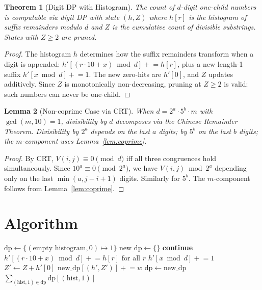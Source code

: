 \documentclass[11pt]{article}
\newtheorem{theorem}{Theorem}
\newtheorem{lemma}[theorem]{Lemma}
\begin{document}
\begin{theorem}[Digit DP with Histogram]
The count of $d$-digit one-child numbers is computable via digit DP with state $(h, Z)$ where $h[r]$ is the histogram of suffix remainders modulo $d$ and $Z$ is the cumulative count of divisible substrings. States with $Z \ge 2$ are pruned.
\end{theorem}

\begin{proof}
The histogram $h$ determines how the suffix remainders transform when a digit is appended: $h'[(r \cdot 10 + x) \bmod d] \mathrel{+}= h[r]$, plus a new length-1 suffix $h'[x \bmod d] \mathrel{+}= 1$. The new zero-hits are $h'[0]$, and $Z$ updates additively. Since $Z$ is monotonically non-decreasing, pruning at $Z \ge 2$ is valid: such numbers can never be one-child.
\end{proof}

\begin{lemma}[Non-coprime Case via CRT]
When $d = 2^a \cdot 5^b \cdot m$ with $\gcd(m,10) = 1$, divisibility by $d$ decomposes via the Chinese Remainder Theorem. Divisibility by $2^a$ depends on the last $a$ digits; by $5^b$ on the last $b$ digits; the $m$-component uses Lemma~\ref{lem:coprime}.
\end{lemma}

\begin{proof}
By CRT, $V(i,j) \equiv 0 \pmod{d}$ iff all three congruences hold simultaneously. Since $10^a \equiv 0 \pmod{2^a}$, we have $V(i,j) \bmod 2^a$ depending only on the last $\min(a, j-i+1)$ digits. Similarly for $5^b$. The $m$-component follows from Lemma~\ref{lem:coprime}.
\end{proof}

\section{Algorithm}

\begin{algorithm}[H]
\caption{Count $d$-digit one-child numbers}
\begin{algorithmic}[1]
    \EndIf
  \State $\mathrm{dp} \gets \{(\text{empty histogram}, 0) \mapsto 1\}$
    \State $\mathrm{new\_dp} \gets \{\}$
       \textbf{continue} \EndIf
        \State $h'[(r \cdot 10 + x) \bmod d] \mathrel{+}= h[r]$ for all $r$
        \State $h'[x \bmod d] \mathrel{+}= 1$
        \State $Z' \gets Z + h'[0]$
          \State $\mathrm{new\_dp}[(h', Z')] \mathrel{+}= w$
        \EndIf
      \EndFor
    \EndFor
    \State $\mathrm{dp} \gets \mathrm{new\_dp}$
  \EndFor
  \State \Return $\sum_{(\mathrm{hist}, 1) \in \mathrm{dp}} \mathrm{dp}[(\mathrm{hist}, 1)]$
\EndProcedure
\end{algorithmic}
\end{algorithm}
\end{document}
